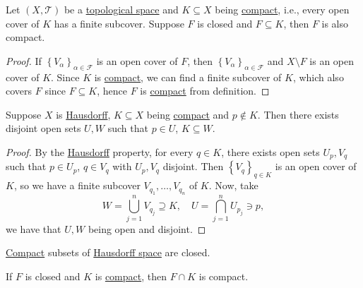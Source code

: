 \begin{theorem}
	Let \((X, \mathcal{T})\) be a \hyperref[def:topological-space]{topological space} and \(K \subseteq X\) being \hyperref[def:compact]{compact}, i.e., every open cover of \(K\) has a finite subcover. Suppose \(F\) is closed and \(F \subseteq K\), then \(F\) is also compact.
\end{theorem}
\begin{proof}
	If \(\left\{ V_\alpha \right\}_{\alpha \in \mathcal{F} } \) is an open cover of \(F\), then \(\left\{ V_\alpha  \right\}_{\alpha \in \mathcal{F} } \) and \(X\setminus F\) is an open cover of \(K\). Since \(K\) is \hyperref[def:compact]{compact}, we can find a finite subcover of \(K\), which also covers \(F\) since \(F \subseteq K\), hence \(F\) is \hyperref[def:compact]{compact} from definition.
\end{proof}

\begin{theorem}
	Suppose \(X\) is \hyperref[def:Hausdorff]{Hausdorff}, \(K \subseteq X\) being \hyperref[def:compact]{compact} and \(p \notin K\). Then there exists disjoint open sets \(U, W\) such that \(p\in U\), \(K \subseteq W\).
\end{theorem}
\begin{proof}
	By the \hyperref[def:Hausdorff]{Hausdorff} property, for every \(q\in K\), there exists open sets \(U_p, V_q\) such that \(p\in U_p\), \(q\in V_q\) with \(U_p, V_q\) disjoint. Then \(\left\{ V_q \right\} _{q\in K}\) is an open cover of \(K\), so we have a finite subcover \(V_{q_1}, \ldots  , V_{q_n}\) of \(K\). Now, take
	\[
		W = \bigcup_{j=1}^{n} V_{q_j} \supseteq K,\quad
		U = \bigcap_{j=1}^{n} U_{p_j} \ni p,
	\]
	we have that \(U, W\) being open and disjoint.
\end{proof}

\begin{corollary}
	\hyperref[def:compact]{Compact} subsets of \hyperref[def:Hausdorff]{Hausdorff space} are closed.
\end{corollary}

\begin{corollary}
	If \(F\) is closed and \(K\) is \hyperref[def:compact]{compact}, then \(F \cap K\) is compact.
\end{corollary}

